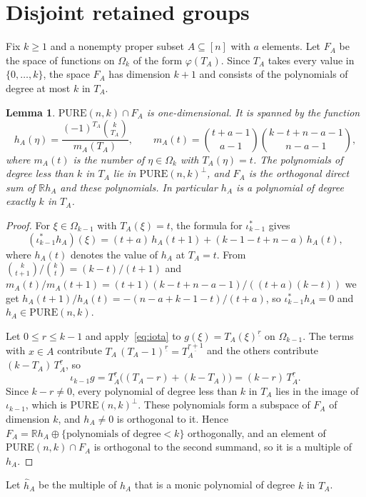 \documentclass[11pt]{amsart}
\newtheorem{lem}[thm]{Lemma}
\theoremstyle{remark}
\numberwithin{equation}{section}
\newcommand{\R}{\mathbb R}
\newcommand{\PURE}{\mathrm{PURE}}
\newcommand{\ff}[2]{#1^{\underline{#2}}}
\begin{document}
\section{Disjoint retained groups}\label{sec:groups}

Fix $k\ge1$ and a nonempty proper subset $A\subseteq[n]$ with $a$ elements. Let $F_A$ be the space of functions on $\Omega_k$ of the form $\varphi(T_A)$. Since $T_A$ takes every value in $\{0,\dots,k\}$, the space $F_A$ has dimension $k+1$ and consists of the polynomials of degree at most $k$ in $T_A$.

\begin{lem}\label{lem:hA}
$\PURE(n,k)\cap F_A$ is one-dimensional. It is spanned by the function
\[
h_A(\eta)=\frac{(-1)^{T_A}\binom k{T_A}}{m_A(T_A)},\qquad m_A(t)=\binom{t+a-1}{a-1}\binom{k-t+n-a-1}{n-a-1},
\]
where $m_A(t)$ is the number of $\eta\in\Omega_k$ with $T_A(\eta)=t$. The polynomials of degree less than $k$ in $T_A$ lie in $\PURE(n,k)^\perp$, and $F_A$ is the orthogonal direct sum of $\R h_A$ and these polynomials. In particular $h_A$ is a polynomial of degree exactly $k$ in $T_A$.
\end{lem}

\begin{proof}
For $\xi\in\Omega_{k-1}$ with $T_A(\xi)=t$, the formula for $\iota^*_{k-1}$ gives
\[
(\iota_{k-1}^*h_A)(\xi)=(t+a)\,h_A(t+1)+(k-1-t+n-a)\,h_A(t),
\]
where $h_A(t)$ denotes the value of $h_A$ at $T_A=t$. From $\binom k{t+1}/\binom kt=(k-t)/(t+1)$ and $m_A(t)/m_A(t+1)=(t+1)(k-t+n-a-1)/((t+a)(k-t))$ we get $h_A(t+1)/h_A(t)=-(n-a+k-1-t)/(t+a)$, so $\iota_{k-1}^*h_A=0$ and $h_A\in\PURE(n,k)$.

Let $0\le r\le k-1$ and apply~\eqref{eq:iota} to $g(\xi)=\ff{T_A(\xi)}r$ on $\Omega_{k-1}$. The terms with $x\in A$ contribute $T_A\,\ff{(T_A-1)}r=\ff{T_A}{r+1}$ and the others contribute $(k-T_A)\,\ff{T_A}r$, so
\[
\iota_{k-1}g=\ff{T_A}{r}\bigl((T_A-r)+(k-T_A)\bigr)=(k-r)\,\ff{T_A}r .
\]
Since $k-r\ne0$, every polynomial of degree less than $k$ in $T_A$ lies in the image of $\iota_{k-1}$, which is $\PURE(n,k)^\perp$. These polynomials form a subspace of $F_A$ of dimension $k$, and $h_A\ne0$ is orthogonal to it. Hence $F_A=\R h_A\oplus\{\text{polynomials of degree}<k\}$ orthogonally, and an element of $\PURE(n,k)\cap F_A$ is orthogonal to the second summand, so it is a multiple of $h_A$.
\end{proof}

Let $\hat h_A$ be the multiple of $h_A$ that is a monic polynomial of degree $k$ in $T_A$.
\end{document}
